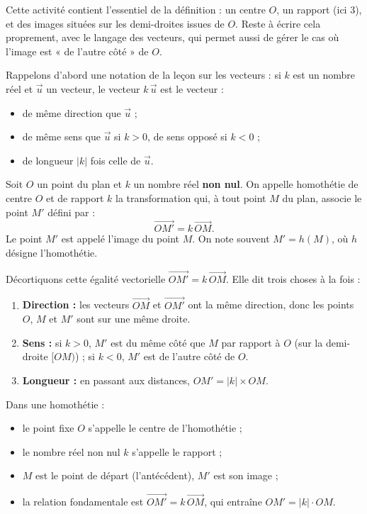 \documentclass[11pt]{article}
\newcommand{\cle}[1]{{\popxbold\color{popdark}#1}}
\newcounter{popsec}
\newcounter{popsub}
\newcommand{\courssub}[1]{%
  \stepcounter{popsub}%
  \par\vspace{9pt}\noindent{\popxbold\fontsize{11.5}{13}\selectfont\color{popink}{\color{poporange}\thepopsec.\thepopsub}\hspace{6pt}#1}\par\nopagebreak\vspace{4pt}
}
\begin{document}
Cette activité contient l'essentiel de la définition : un centre $O$, un rapport (ici $3$), et des images situées sur les demi-droites issues de $O$. Reste à écrire cela proprement, avec le langage des vecteurs, qui permet aussi de gérer le cas où l'image est « de l'autre côté » de $O$.

\courssub{Définition de l'homothétie}

Rappelons d'abord une notation de la leçon sur les vecteurs : si $k$ est un nombre réel et $\vec{u}$ un vecteur, le vecteur $k\,\vec{u}$ est le vecteur :
\begin{itemize}
\item de même direction que $\vec{u}$ ;
\item de même sens que $\vec{u}$ si $k > 0$, de sens opposé si $k < 0$ ;
\item de longueur $|k|$ fois celle de $\vec{u}$.
\end{itemize}

\begin{definition}
Soit $O$ un point du plan et $k$ un nombre réel \textbf{non nul}.
On appelle \cle{homothétie} de \cle{centre} $O$ et de \cle{rapport} $k$ la transformation qui, à tout point $M$ du plan, associe le point $M'$ défini par :
\[ \overrightarrow{OM'} = k \, \overrightarrow{OM}. \]
Le point $M'$ est appelé l'\cle{image} du point $M$. On note souvent $M' = h(M)$, où $h$ désigne l'homothétie.
\end{definition}

Décortiquons cette égalité vectorielle $\overrightarrow{OM'} = k\,\overrightarrow{OM}$. Elle dit trois choses à la fois :
\begin{enumerate}
\item \textbf{Direction :} les vecteurs $\overrightarrow{OM}$ et $\overrightarrow{OM'}$ ont la même direction, donc les points $O$, $M$ et $M'$ sont sur une même droite.
\item \textbf{Sens :} si $k > 0$, $M'$ est du même côté que $M$ par rapport à $O$ (sur la demi-droite $[OM)$) ; si $k < 0$, $M'$ est de l'autre côté de $O$.
\item \textbf{Longueur :} en passant aux distances, $OM' = |k| \times OM$.
\end{enumerate}

\begin{aretenir}[Vocabulaire]
Dans une homothétie :
\begin{itemize}
\item le point fixe $O$ s'appelle le \cle{centre} de l'homothétie ;
\item le nombre réel non nul $k$ s'appelle le \cle{rapport} ;
\item $M$ est le point de départ (l'antécédent), $M'$ est son \cle{image} ;
\item la relation fondamentale est $\overrightarrow{OM'} = k\,\overrightarrow{OM}$, qui entraîne $OM' = |k| \cdot OM$.
\end{itemize}
\end{aretenir}
\end{document}
